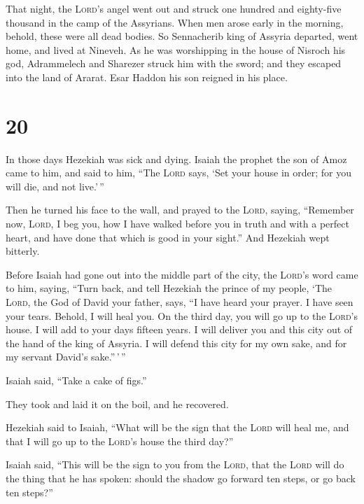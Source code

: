  That night, the \textsc{Lord}'s angel went out and
struck one hundred and eighty-five thousand in the camp of the
Assyrians. When men arose early in the morning, behold, these were all
dead bodies.  So Sennacherib king of Assyria departed,
went home, and lived at Nineveh.  As he was worshipping
in the house of Nisroch his god, Adrammelech and Sharezer struck him
with the sword; and they escaped into the land of Ararat. Esar Haddon
his son reigned in his place.

\hypertarget{section-19}{%
\section{20}\label{section-19}}

 In those days Hezekiah was sick and dying. Isaiah the
prophet the son of Amoz came to him, and said to him, ``The
\textsc{Lord} says, `Set your house in order; for you will die, and not
live.'\,''

 Then he turned his face to the wall, and prayed to the
\textsc{Lord}, saying,  ``Remember now, \textsc{Lord}, I
beg you, how I have walked before you in truth and with a perfect heart,
and have done that which is good in your sight.'' And Hezekiah wept
bitterly.

 Before Isaiah had gone out into the middle part of the
city, the \textsc{Lord}'s word came to him, saying, 
``Turn back, and tell Hezekiah the prince of my people, `The
\textsc{Lord}, the God of David your father, says, ``I have heard your
prayer. I have seen your tears. Behold, I will heal you. On the third
day, you will go up to the \textsc{Lord}'s house.  I will
add to your days fifteen years. I will deliver you and this city out of
the hand of the king of Assyria. I will defend this city for my own
sake, and for my servant David's sake.''\,'\,''

 Isaiah said, ``Take a cake of figs.''

They took and laid it on the boil, and he recovered.

 Hezekiah said to Isaiah, ``What will be the sign that the
\textsc{Lord} will heal me, and that I will go up to the \textsc{Lord}'s
house the third day?''

 Isaiah said, ``This will be the sign to you from the
\textsc{Lord}, that the \textsc{Lord} will do the thing that he has
spoken: should the shadow go forward ten steps, or go back ten steps?''

